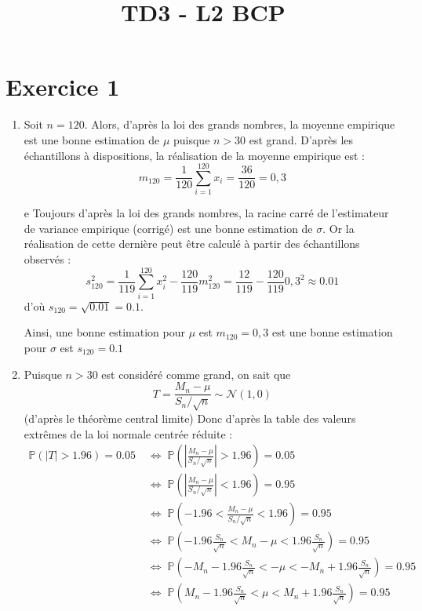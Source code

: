 \documentclass[a4paper,oneside,12pt]{article}
\title{TD3 - L2 BCP}
\author{}
\date{}
\theoremstyle{plain}
\def\P{{\mathbb P}}
\begin{document}
\maketitle

\section*{Exercice 1}

\begin{enumerate}
\item Soit $n = 120$. Alors, d'après la loi des grands nombres, la moyenne empirique est une bonne estimation de $\mu$ puisque $n>30$ est grand. D'après les échantillons à dispositions, la réalisation de la moyenne empirique est :
    $$m_{120} =  \frac{1}{120}\sum_{i=1}^{120}x_i = \frac{36}{120} = 0,3$$
    
e    Toujours d'après la loi des grands nombres, la racine carré de l'estimateur de variance empirique (corrigé) est une bonne estimation de $\sigma$. Or la réalisation de cette dernière peut être calculé à partir des échantillons observés :
    $$s_{120}^2 = \frac{1}{119}\sum_{i=1}^{120}x_i^2 - \frac{120}{119}m_{120}^2 = \frac{12}{119}-\frac{120}{119}0,3^2 \approx 0.01$$
    d'où $s_{120} = \sqrt{0.01} = 0.1$.
    
    Ainsi, une bonne estimation pour $\mu$ est $m_{120}  = 0,3$ est une bonne estimation pour $\sigma$ est $s_{120} = 0.1$
    
    
    \item Puisque $n> 30$ est considéré comme grand, on sait que $$T = \frac{M_n - \mu}{S_{n}/\sqrt{n}} \sim \mathcal{N}\left(1, 0\right)$$
    (d'après le théorème central limite)
    Donc d'après la table des valeurs extrêmes de la loi normale centrée réduite :
    \begin{align*}
        \P\left(\left|T\right|>1.96\right) = 0.05 \; &\Longleftrightarrow \; \P\left(\left|\frac{M_n - \mu}{S_n/\sqrt{n}}\right|>1.96\right) = 0.05 \\
        &\Longleftrightarrow \; \P(\left|\frac{M_n - \mu}{S_n/\sqrt{n}}\right|<1.96) = 0.95\\
        & \Longleftrightarrow \; \P\left(-1.96 <\frac{M_n - \mu}{S_n/\sqrt{n}}<1.96\right) = 0.95\\
        & \Longleftrightarrow \; \P\left(-1.96\frac{S_n}{\sqrt{n}} <M_n - \mu<1.96\frac{S_n}{\sqrt{n}}\right) = 0.95\\
        & \Longleftrightarrow \; \P\left(-M_n-1.96\frac{S_n}{\sqrt{n}} <- \mu<-M_n + 1.96\frac{S_n}{\sqrt{n}}\right) = 0.95\\
        & \Longleftrightarrow \; \P\left(M_n-1.96\frac{S_n}{\sqrt{n}} <\mu<M_n + 1.96\frac{S_n}{\sqrt{n}}\right) = 0.95\\
    \end{align*}
    

\end{enumerate}
\end{document}
